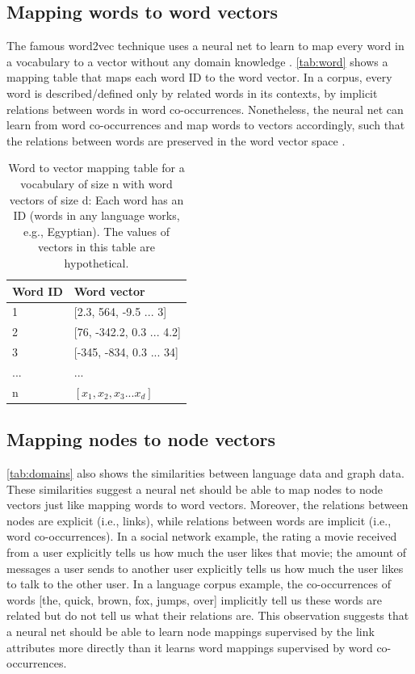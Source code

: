 \documentclass[twocolumn]{article}
\begin{document}
\subsection{Mapping words to word vectors}
The famous word2vec technique uses a neural net to learn to map every word in a 
vocabulary to a vector without any domain knowledge \cite{mikolov2013efficient}.
\autoref{tab:word} shows a mapping table that maps each word ID to the word 
vector.
In a corpus, every word is described/defined only by related words in its 
contexts, by implicit relations between words in word co-occurrences.
Nonetheless, the neural net can learn from word co-occurrences and map words to 
vectors accordingly,
such that the relations between words are preserved in the word vector space 
\cite{mikolov2013distributed}.
\begin{table}[h]
	\centering
	\caption{Word to vector mapping table for a vocabulary of size n with word 
		vectors of size d:
		Each word has an ID (words in any language works, e.g., Egyptian).
		The values of vectors in this table are hypothetical.}
	\begin{tabularx}{0.5\textwidth}{|X|X|} \hline
		\textbf{Word ID} & \textbf{Word vector} \\ \hline
		1 & [2.3, 564, -9.5 ... 3] \\ \hline
		2 & [76, -342.2, 0.3 ... 4.2] \\ \hline
		3 & [-345, -834, 0.3 ... 34] \\ \hline
		... & ... \\ \hline
		n & $ [x_1, x_2, x_3 ... x_d] $ \\ \hline
	\end{tabularx}
	\label{tab:word}
\end{table}

\subsection{Mapping nodes to node vectors}
\autoref{tab:domains} also shows the similarities between language data and 
graph data.
These similarities suggest a neural net should be able to map nodes to node 
vectors just like mapping words to word vectors.
Moreover, the relations between nodes are explicit (i.e., links),
while relations between words are implicit (i.e., word co-occurrences).
In a social network example, the rating a movie received from a user explicitly 
tells us how much the user likes that movie;
the amount of messages a user sends to another user explicitly tells us how 
much the user likes to talk to the other user.
In a language corpus example, the co-occurrences of words [the, quick, brown, 
fox, jumps, over] implicitly tell us these words are related but do not tell us 
what their relations are.
This observation suggests that a neural net should be able to learn node 
mappings supervised by the link attributes more directly than it learns word 
mappings supervised by word co-occurrences.
\end{document}
